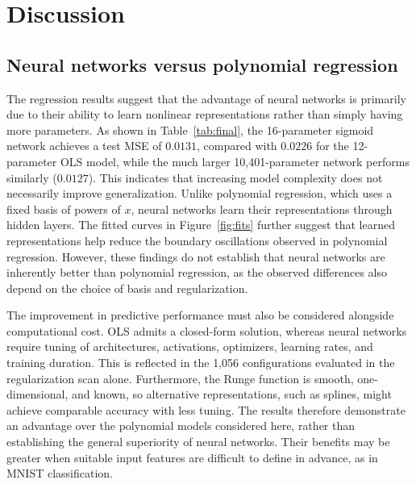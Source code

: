 \documentclass[amssymb,twocolumn,aps]{revtex4}
\begin{document}
\section{Discussion}\label{sec:discussion}
\subsection{Neural networks versus polynomial regression}
The regression results suggest that the advantage of neural networks is primarily due to their ability to learn nonlinear representations rather than simply having more parameters. As shown in Table~\ref{tab:final}, the 16-parameter sigmoid network achieves a test MSE of $0.0131$, compared with $0.0226$ for the 12-parameter OLS model, while the much larger 10,401-parameter network performs similarly ($0.0127$). This indicates that increasing model complexity does not necessarily improve generalization. Unlike polynomial regression, which uses a fixed basis of powers of $x$, neural networks learn their representations through hidden layers. The fitted curves in Figure~\ref{fig:fits} further suggest that learned representations help reduce the boundary oscillations observed in polynomial regression. However, these findings do not establish that neural networks are inherently better than polynomial regression, as the observed differences also depend on the choice of basis and regularization.

The improvement in predictive performance must also be considered alongside computational cost. OLS admits a closed-form solution, whereas neural networks require tuning of architectures, activations, optimizers, learning rates, and training duration. This is reflected in the 1,056 configurations evaluated in the regularization scan alone.  Furthermore, the Runge function is smooth, one-dimensional, and known, so alternative representations, such as splines, might achieve comparable accuracy with less tuning. The results therefore demonstrate an advantage over the polynomial models considered here, rather than establishing the general superiority of neural networks. Their benefits may be greater when suitable input features are difficult to define in advance, as in MNIST classification.
\end{document}
